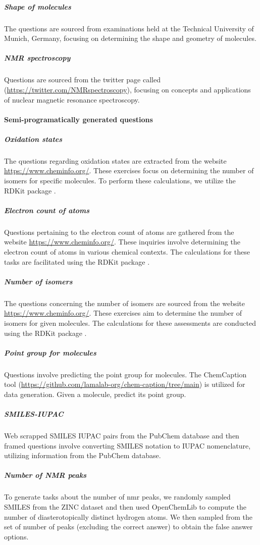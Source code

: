 \documentclass[11pt, oneside]{article}
\begin{document}
\subparagraph{Shape of molecules}
The questions are sourced from examinations held at the Technical University of Munich, Germany, focusing on determining the shape and geometry of molecules.

\subparagraph{\gls{NMR} spectroscopy}
Questions are sourced from the twitter page called (\url{https://twitter.com/NMRspectroscopy}), focusing on concepts and applications of nuclear magnetic resonance spectroscopy.


\paragraph{Semi-programatically generated questions}

\subparagraph{Oxidation states}
The questions regarding oxidation states are extracted from the website \url{https://www.cheminfo.org/}. These exercises focus on determining the number of isomers for specific molecules. To perform these calculations, we utilize the RDKit package \cite{bento2020open}.
\subparagraph{Electron count of atoms}
Questions pertaining to the electron count of atoms are gathered from the website \url{https://www.cheminfo.org/}. These inquiries involve determining the electron count of atoms in various chemical contexts. The calculations for these tasks are facilitated using the RDKit package \cite{bento2020open}.
\subparagraph{Number of isomers}
The questions concerning the number of isomers are sourced from the website \url{https://www.cheminfo.org/}. These exercises aim to determine the number of isomers for given molecules. The calculations for these assessments are conducted using the RDKit package \cite{bento2020open}.
\subparagraph{Point group for molecules}
Questions involve predicting the point group for molecules. The ChemCaption tool (\url{https://github.com/lamalab-org/chem-caption/tree/main}) is utilized for data generation. Given a molecule, predict its point group.
\subparagraph{SMILES-IUPAC}
Web scrapped SMILES IUPAC pairs from the PubChem database \cite{pubchem} and then framed questions involve converting SMILES notation to IUPAC nomenclature, utilizing information from the PubChem database.

\subparagraph{Number of NMR peaks} To generate tasks about the number of \gls{nmr} peaks, we randomly sampled SMILES from the ZINC dataset and then used OpenChemLib\cite{openchemlib} to compute the number of diasterotopically distinct hydrogen atoms.
We then sampled from the set of number of peaks (excluding the correct answer) to obtain the false answer options.
\end{document}
